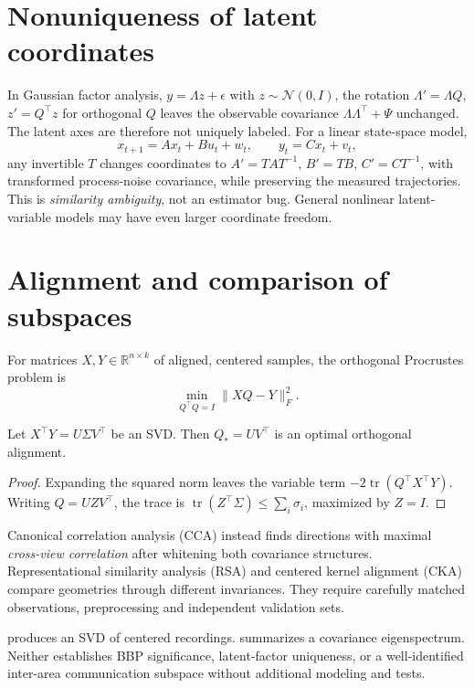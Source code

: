 \section{Nonuniqueness of latent coordinates}
In Gaussian factor analysis, $y=\Lambda z+\epsilon$ with
$z\sim\mathcal N(0,I)$, the rotation
$\Lambda'=\Lambda Q$, $z'=Q^\top z$ for orthogonal $Q$
leaves the observable covariance $\Lambda\Lambda^\top+\Psi$
unchanged. The latent axes are therefore not uniquely labeled.
For a linear state-space model,
\[
x_{t+1}=Ax_t+Bu_t+w_t,\qquad y_t=Cx_t+v_t,
\]
any invertible $T$ changes coordinates to
$A'=TAT^{-1}$, $B'=TB$, $C'=CT^{-1}$,
with transformed process-noise covariance, while preserving
the measured trajectories. This is \emph{similarity ambiguity},
not an estimator bug. General nonlinear latent-variable models
may have even larger coordinate freedom.

\section{Alignment and comparison of subspaces}
For matrices $X,Y\in\mathbb R^{n\times k}$ of aligned,
centered samples, the orthogonal Procrustes problem is
\[
\min_{Q^\top Q=I}\|XQ-Y\|_F^2.
\]
\begin{proposition}
Let $X^\top Y=U\Sigma V^\top$ be an SVD. Then
$Q_*=UV^\top$ is an optimal orthogonal alignment.
\end{proposition}
\begin{proof}
Expanding the squared norm leaves the variable term
$-2\operatorname{tr}(Q^\top X^\top Y)$.
Writing $Q=U Z V^\top$, the trace is
$\operatorname{tr}(Z^\top\Sigma)\le\sum_i\sigma_i$,
maximized by $Z=I$.
\end{proof}
Canonical correlation analysis (CCA) instead finds directions
with maximal \emph{cross-view correlation} after whitening both
covariance structures. Representational similarity analysis (RSA)
and centered kernel alignment (CKA) compare geometries through
different invariances. They require carefully matched observations,
preprocessing and independent validation sets.

\begin{example}
 produces an SVD of centered
recordings.  summarizes
a covariance eigenspectrum. Neither establishes BBP significance,
latent-factor uniqueness, or a well-identified inter-area
communication subspace without additional modeling and tests.
\end{example}
